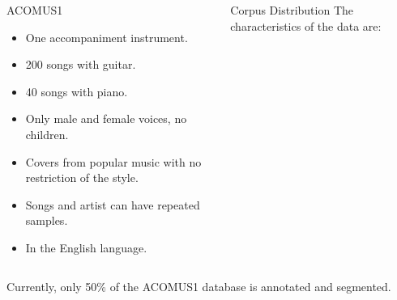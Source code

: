 \documentclass[final]{beamer}
\newlength{\onecolwid}
\newlength{\twocolwid}
\begin{document}
\begin{frame}[t]
\begin{columns}[t]
\begin{column}{\twocolwid}
\begin{columns}[t,totalwidth=\twocolwid]
\begin{column}{\onecolwid}
\begin{alertblock}{ACOMUS1}
\begin{itemize}
\item One accompaniment instrument. 
\item 200 songs with guitar.
\item 40 songs with piano.
\item Only male and female voices, no children.
\item Covers from popular music with no restriction of the style.
\item Songs and artist can have repeated samples.
\item In the English language.
\end{itemize}


\end{alertblock}



\end{column} %



\begin{column}{\onecolwid}\vspace{-.6in} %
\begin{alertblock}{Corpus Distribution}
The characteristics of the data are:
    
    

\end{alertblock}


\end{column} %

\end{columns} %

\centering Currently, only 50\% of the ACOMUS1 database is annotated and segmented.


 \begin{flushleft}
     \vskip-1cm
    \end{flushleft}


\end{column}
\end{columns}
\end{frame}
\end{document}
